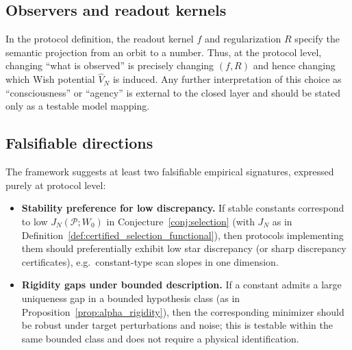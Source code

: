\subsection{Observers and readout kernels}
\label{sec:discussion_observers}

In the protocol definition, the readout kernel $f$ and regularization $R$ specify the semantic projection from an orbit to a number.
Thus, at the protocol level, changing ``what is observed'' is precisely changing $(f,R)$ and hence changing which Wish potential $\widehat V_N$ is induced.
Any further interpretation of this choice as ``consciousness'' or ``agency'' is external to the closed layer and should be stated only as a testable model mapping.

\subsection{Falsifiable directions}
\label{sec:discussion_falsifiable}

The framework suggests at least two falsifiable empirical signatures, expressed purely at protocol level:
\begin{itemize}
\item \textbf{Stability preference for low discrepancy.}
If stable constants correspond to low $J_N(\mathcal{P};W_0)$ in Conjecture~\ref{conj:selection} (with $J_N$ as in Definition~\ref{def:certified_selection_functional}), then protocols implementing them should preferentially exhibit low star discrepancy (or sharp discrepancy certificates), e.g.\ constant-type scan slopes in one dimension.
\item \textbf{Rigidity gaps under bounded description.}
If a constant admits a large uniqueness gap in a bounded hypothesis class (as in Proposition~\ref{prop:alpha_rigidity}), then the corresponding minimizer should be robust under target perturbations and noise; this is testable within the same bounded class and does not require a physical identification.
\end{itemize}


